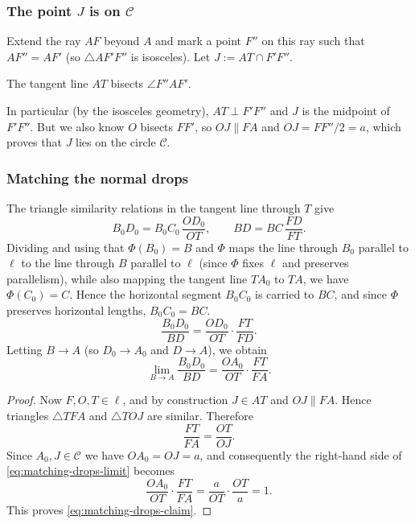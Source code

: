 \subsubsection{The point \texorpdfstring{$J$}{J} is on \texorpdfstring{$\mathcal{C}$}{C}}

Extend the ray $AF$ beyond $A$ and mark a point $F''$ on this ray such that $AF''=AF'$ (so $\triangle AF'F''$ is isosceles). Let $J:=AT\cap F'F''$.

\begin{lemma}
  The tangent line $AT$ bisects $\angle F''AF'$.
\end{lemma}

In particular (by the isosceles geometry), $AT\perp F'F''$ and $J$ is the midpoint of $F'F''$. But we also know $O$ bisects $FF'$, so $OJ\parallel FA$ and $OJ=FF''/2=a$, which proves that $J$ lies on the circle $\mathcal{C}$.

\subsubsection{Matching the normal drops}

The triangle similarity relations in the tangent line through $T$ give
\begin{equation}
  B_0D_0 = B_0C_0\,\frac{OD_0}{OT},
  \qquad
  BD = BC\,\frac{FD}{FT}.
\end{equation}
Dividing and using that $\Phi(B_0)=B$ and $\Phi$ maps the line through $B_0$ parallel to $\ell$ to the line through $B$ parallel to $\ell$ (since $\Phi$ fixes $\ell$ and preserves parallelism), while also mapping the tangent line $TA_0$ to $TA$, we have $\Phi(C_0)=C$. Hence the horizontal segment $B_0C_0$ is carried to $BC$, and since $\Phi$ preserves horizontal lengths, $B_0C_0=BC$.
\begin{equation}
  \frac{B_0D_0}{BD}=\frac{OD_0}{OT}\cdot\frac{FT}{FD}.
\end{equation}
Letting $B\to A$ (so $D_0\to A_0$ and $D\to A$), we obtain
\begin{equation}
  \lim_{B\to A}\frac{B_0D_0}{BD}=\frac{OA_0}{OT}\cdot\frac{FT}{FA}.
\label{eq:matching-drops-limit}
\end{equation}

\begin{proof}
  Now $F,O,T\in\ell$, and by construction $J\in AT$ and $OJ\parallel FA$. Hence triangles $\triangle TFA$ and $\triangle TOJ$ are similar. Therefore
  \[
    \frac{FT}{FA}=\frac{OT}{OJ}.
  \]
  Since $A_0,J\in\mathcal C$ we have $OA_0=OJ=a$, and consequently the right-hand side of \eqref{eq:matching-drops-limit} becomes
  \[
    \frac{OA_0}{OT}\cdot\frac{FT}{FA}=\frac{a}{OT}\cdot\frac{OT}{a}=1.
  \]
  This proves \eqref{eq:matching-drops-claim}.
\end{proof}

